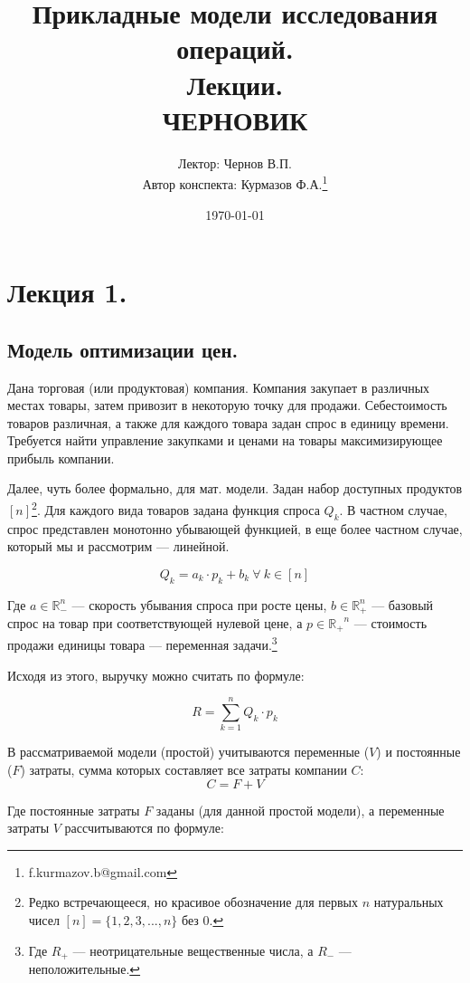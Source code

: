 \documentclass[reqno]{article}
\title{Прикладные модели исследования операций.\\ Лекции.\\ ЧЕРНОВИК}
\author{Лектор: Чернов В.П.\\ Автор конспекта: Курмазов Ф.А.\thanks{f.kurmazov.b@gmail.com}}
\date{\today}
\theoremstyle{definition}
\theoremstyle{definition}
\theoremstyle{definition}
\theoremstyle{definition}
\theoremstyle{definition}
\theoremstyle{definition}
\theoremstyle{definition}
\theoremstyle{definition}
\theoremstyle{definition}
\begin{document}
	\setlength{\parindent}{0pt}

	\maketitle

	\tableofcontents


	\newpage
	\section{Лекция 1.}
		\subsection{Модель оптимизации цен.}
			
			Дана торговая (или продуктовая) компания. Компания закупает в различных местах товары, затем привозит в некоторую точку для продажи. Себестоимость товаров различная, а также для каждого товара задан спрос в единицу времени. Требуется найти управление закупками и ценами на товары максимизирующее прибыль компании.
			
			Далее, чуть более формально, для мат. модели. Задан набор доступных продуктов $[n]$\footnote{Редко встречающееся, но красивое обозначение для первых $n$ натуральных чисел $[n] = \{1, 2, 3, ..., n\}$ без $0$.}. Для каждого вида товаров задана функция спроса $Q_k$. В частном случае, спрос представлен монотонно убывающей функцией, в еще более частном случае, который мы и рассмотрим --- линейной.

			$$Q_k = a_k\cdot p_k + b_k\ \forall\ k \in [n]$$

			Где $a \in \mathds{R}^n_-$ --- скорость убывания спроса при росте цены, $b \in \mathds{R}^n_+$ --- базовый спрос на товар при соответствующей нулевой цене, а  $p \in \mathds{R_+}^n$ --- стоимость продажи единицы товара --- переменная задачи.\footnote{Где $R_+$ --- неотрицательные вещественные числа, а $R_-$ --- неположительные.}
			
			Исходя из этого, выручку можно считать по формуле:

			$$R = \sum^n_{k=1} Q_k\cdot p_k$$	
			
			В рассматриваемой модели (простой) учитываются переменные ($V$) и постоянные ($F$) затраты, сумма которых составляет все затраты компании $C$:
			$$C = F + V$$

			Где постоянные затраты $F$ заданы (для данной простой модели), а переменные затраты $V$ рассчитываются по формуле:
\end{document}
